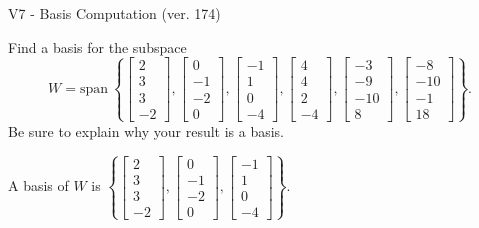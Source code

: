 \begin{exercise}
  \begin{exerciseTitle}V7 - Basis Computation (ver. 174)\end{exerciseTitle}
  \begin{exerciseStatement}
    Find a basis for the subspace 
\[W=\mathrm{span}\ \left\{\left[\begin{array}{r}
2 \\
3 \\
3 \\
-2
\end{array}\right] , \left[\begin{array}{r}
0 \\
-1 \\
-2 \\
0
\end{array}\right] , \left[\begin{array}{r}
-1 \\
1 \\
0 \\
-4
\end{array}\right] , \left[\begin{array}{r}
4 \\
4 \\
2 \\
-4
\end{array}\right] , \left[\begin{array}{r}
-3 \\
-9 \\
-10 \\
8
\end{array}\right] , \left[\begin{array}{r}
-8 \\
-10 \\
-1 \\
18
\end{array}\right]\right\}.\]
 Be sure to explain why your result is a basis.


  \end{exerciseStatement}
  \begin{exerciseAnswer}
   A basis of \(W\) is  \(\left\{\left[\begin{array}{r}
2 \\
3 \\
3 \\
-2
\end{array}\right] , \left[\begin{array}{r}
0 \\
-1 \\
-2 \\
0
\end{array}\right] , \left[\begin{array}{r}
-1 \\
1 \\
0 \\
-4
\end{array}\right]\right\}\).
  


  \end{exerciseAnswer}
\end{exercise}